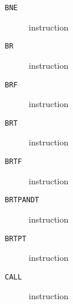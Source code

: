 \clearpage
\begin{description}
\item[\texttt{BNE}] instruction\\

\end{description}
\clearpage
\begin{description}
\item[\texttt{BR}] instruction\\

\end{description}
\clearpage
\begin{description}
\item[\texttt{BRF}] instruction\\

\end{description}
\clearpage
\begin{description}
\item[\texttt{BRT}] instruction\\

\end{description}
\clearpage
\begin{description}
\item[\texttt{BRTF}] instruction\\

\end{description}
\clearpage
\begin{description}
\item[\texttt{BRTPANDT}] instruction\\

\end{description}
\clearpage
\begin{description}
\item[\texttt{BRTPT}] instruction\\

\end{description}
\clearpage
\begin{description}
\item[\texttt{CALL}] instruction\\

\end{description}
